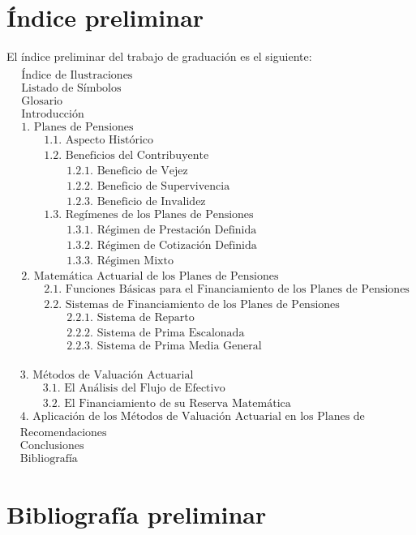 \documentclass[12pt,letterpaper,titlepage]{article}
\begin{document}
\newpage

\section{Índice preliminar}
El índice preliminar del trabajo de graduación es el siguiente:
\begin{align*}
&\text{Índice de Ilustraciones}\\
&\text{Listado de Símbolos}\\
&\text{Glosario}\\
&\text{Introducción}\\
&\text{1. Planes de Pensiones}\\
&\qquad\text{1.1. Aspecto Histórico }\\
&\qquad\text{1.2. Beneficios del Contribuyente }\\
&\qquad\qquad\text{1.2.1. Beneficio de Vejez}\\
&\qquad\qquad\text{1.2.2. Beneficio de Supervivencia}\\
&\qquad\qquad\text{1.2.3. Beneficio de Invalidez}\\
&\qquad\text{1.3. Regímenes de los Planes de Pensiones}\\
&\qquad\qquad\text{1.3.1. Régimen de Prestación Definida}\\
&\qquad\qquad\text{1.3.2. Régimen de Cotización Definida}\\
&\qquad\qquad\text{1.3.3. Régimen Mixto}\\
&\text{2. Matemática Actuarial de los Planes de Pensiones}\\
&\qquad\text{2.1. Funciones Básicas para el Financiamiento de los Planes de Pensiones}\\
&\qquad\text{2.2. Sistemas de Financiamiento de los Planes de Pensiones}\\
&\qquad\qquad\text{2.2.1. Sistema de Reparto}\\
&\qquad\qquad\text{2.2.2. Sistema de Prima Escalonada}\\
&\qquad\qquad\text{2.2.3. Sistema de Prima Media General}\\
\end{align*}

\newpage
\begin{align*}
&\text{3. Métodos de Valuación Actuarial}\\
&\qquad\text{3.1. El Análisis del Flujo de Efectivo}\\
&\qquad\text{3.2. El Financiamiento de su Reserva Matemática}\\
&\text{4. Aplicación de los Métodos de Valuación Actuarial en los Planes de Pensiones Ocupacionales}\\
&\text{Recomendaciones}\\
&\text{Conclusiones}\\
&\text{Bibliografía} 
\end{align*}

\newpage

\section{Bibliografía preliminar}


\label{fin}
\end{document}
